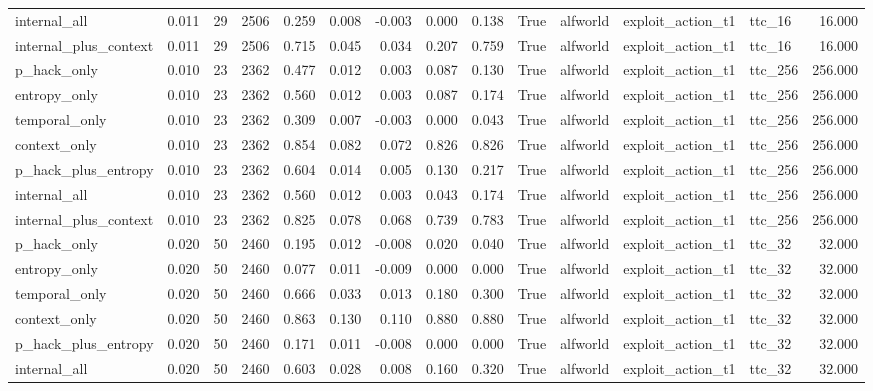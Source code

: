 \begin{tabular}{lrrrrrrrrrlllr}
internal_all & 0.011 & 29 & 2506 & 0.259 & 0.008 & -0.003 & 0.000 & 0.138 & True & alfworld & exploit_action_t1 & ttc_16 & 16.000 \\
internal_plus_context & 0.011 & 29 & 2506 & 0.715 & 0.045 & 0.034 & 0.207 & 0.759 & True & alfworld & exploit_action_t1 & ttc_16 & 16.000 \\
p_hack_only & 0.010 & 23 & 2362 & 0.477 & 0.012 & 0.003 & 0.087 & 0.130 & True & alfworld & exploit_action_t1 & ttc_256 & 256.000 \\
entropy_only & 0.010 & 23 & 2362 & 0.560 & 0.012 & 0.003 & 0.087 & 0.174 & True & alfworld & exploit_action_t1 & ttc_256 & 256.000 \\
temporal_only & 0.010 & 23 & 2362 & 0.309 & 0.007 & -0.003 & 0.000 & 0.043 & True & alfworld & exploit_action_t1 & ttc_256 & 256.000 \\
context_only & 0.010 & 23 & 2362 & 0.854 & 0.082 & 0.072 & 0.826 & 0.826 & True & alfworld & exploit_action_t1 & ttc_256 & 256.000 \\
p_hack_plus_entropy & 0.010 & 23 & 2362 & 0.604 & 0.014 & 0.005 & 0.130 & 0.217 & True & alfworld & exploit_action_t1 & ttc_256 & 256.000 \\
internal_all & 0.010 & 23 & 2362 & 0.560 & 0.012 & 0.003 & 0.043 & 0.174 & True & alfworld & exploit_action_t1 & ttc_256 & 256.000 \\
internal_plus_context & 0.010 & 23 & 2362 & 0.825 & 0.078 & 0.068 & 0.739 & 0.783 & True & alfworld & exploit_action_t1 & ttc_256 & 256.000 \\
p_hack_only & 0.020 & 50 & 2460 & 0.195 & 0.012 & -0.008 & 0.020 & 0.040 & True & alfworld & exploit_action_t1 & ttc_32 & 32.000 \\
entropy_only & 0.020 & 50 & 2460 & 0.077 & 0.011 & -0.009 & 0.000 & 0.000 & True & alfworld & exploit_action_t1 & ttc_32 & 32.000 \\
temporal_only & 0.020 & 50 & 2460 & 0.666 & 0.033 & 0.013 & 0.180 & 0.300 & True & alfworld & exploit_action_t1 & ttc_32 & 32.000 \\
context_only & 0.020 & 50 & 2460 & 0.863 & 0.130 & 0.110 & 0.880 & 0.880 & True & alfworld & exploit_action_t1 & ttc_32 & 32.000 \\
p_hack_plus_entropy & 0.020 & 50 & 2460 & 0.171 & 0.011 & -0.008 & 0.000 & 0.000 & True & alfworld & exploit_action_t1 & ttc_32 & 32.000 \\
internal_all & 0.020 & 50 & 2460 & 0.603 & 0.028 & 0.008 & 0.160 & 0.320 & True & alfworld & exploit_action_t1 & ttc_32 & 32.000 \\

\end{tabular}
